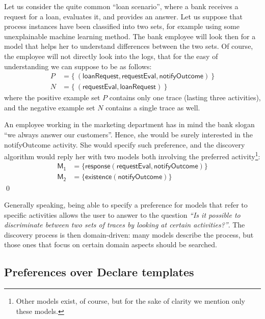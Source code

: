 \begin{example}
\label{ex:prefOverActivities}
Let us consider the quite common ``loan scenario'', where a bank receives a request for a loan, evaluates it, and provides an answer. Let us suppose that process instances have been classified into two sets, for example using some unexplainable machine learning method. The bank employee will look then for a model that helps her to understand differences between the two sets. Of course, the employee will not directly look into the logs, that for the easy of understanding we can suppose to be as follows:
%
\begin{align*}
P & = \{\ (\mathsf{loanRequest}, \mathsf{requestEval}, \mathsf{notifyOutcome})\ \} \\
N & = \{\ (\mathsf{requestEval}, \mathsf{loanRequest})\ \}
\end{align*}
%
where the positive example set $P$ contains only one trace (lasting three activities), and the negative example set $N$ contains a single trace as well.

\noindent An employee working in the marketing department has in mind the bank slogan ``we always answer our customers''. Hence, she would be surely interested in the \textsf{notifyOutcome} activity. She would specify such preference, and the discovery algorithm would reply her with two models both involving the preferred activity\footnote{Other models exist, of course, but for the sake of clarity we mention only these models.}:
%
\begin{align*}
\mathsf{M_1} & = \{ \mathsf{response(requestEval, notifyOutcome)}\} \\
\mathsf{M_2} & = \{ \mathsf{existence(notifyOutcome)}\}
\end{align*}
%
\qed
%
\end{example}

Generally speaking, being able to specify a preference for models that refer to specific activities allows the user to answer to the question \emph{``Is it possible to discriminate between two sets of traces by looking at certain activities?''}. The discovery process is then domain-driven: many models describe the process, but those ones that focus on certain domain aspects should be searched.




\subsection{Preferences over Declare templates}
\label{subsec:prefOverTemplates}

